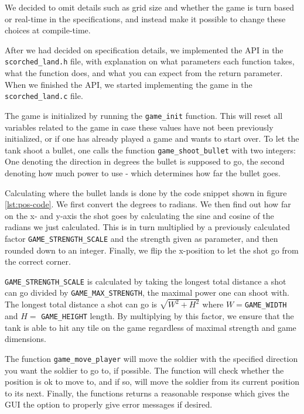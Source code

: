 We decided to omit details such as grid size and whether the game is
turn based or real-time in the specifications, and instead make it
possible to change these choices at compile-time.

After we had decided on specification details, we implemented the
API in the \texttt{scorched\_land.h} file, with explanation on what
parameters each function takes, what the function does, and what you can
expect from the return parameter. When we finished the API, we started
implementing the game in the \texttt{scorched\_land.c} file.

The game is initialized by running the \texttt{game\_init} function.
This will reset all variables related to the game in case these values
have not been previously initialized, or if one has already played a
game and wants to start over. To let the tank shoot a bullet, one calls
the function \texttt{game\_shoot\_bullet} with two integers: One
denoting the direction in degrees the bullet is supposed to go, the
second denoting how much power to use - which determines how far the
bullet goes.



Calculating where the bullet lands is done by the code snippet shown in
figure \ref{lst:pos-code}. We first convert the degrees to radians. We
then find out how far on the x- and y-axis the shot goes by calculating
the sine and cosine of the radians we just calculated. This is in turn
multiplied by a previously calculated factor
\texttt{GAME\_STRENGTH\_SCALE} and the strength given as parameter, and
then rounded down to an integer. Finally, we flip the x-position to
let the shot go from the correct corner.

\texttt{GAME\_STRENGTH\_SCALE} is calculated by taking the longest total
distance a shot can go divided by \texttt{GAME\_MAX\_STRENGTH}, the
maximal power one can shoot with.  The longest total distance a shot can
go is $\sqrt{W^2 + H^2}$ where $W = $\texttt{GAME\_WIDTH} and $H =$
\texttt{GAME\_HEIGHT} length.  By multiplying by this factor, we ensure
that the tank is able to hit any tile on the game regardless of maximal
strength and game dimensions. 



The function \texttt{game\_move\_player} will move the soldier with the
specified direction you want the soldier to go to, if possible. The
function will check whether the position is ok to move to, and if so,
will move the soldier from its current position to its next. Finally,
the functions returns a reasonable response which gives the GUI
the option to properly give error messages if desired.

